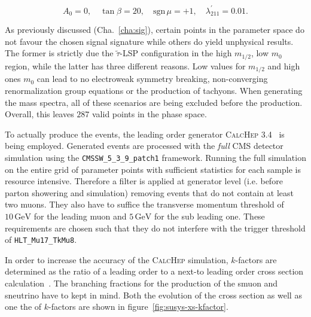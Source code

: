 \begin{equation}
  \label{eq:gen-mssm-parameters}
  A_0 = 0, \quad \tan{\beta} = 20, \quad \text{sgn}\,\mu = +1, \quad \lambda^\prime_{211} = 0.01.
\end{equation}

As previously discussed (Cha.~\ref{cha:sig}), certain points in the parameter space do not favour the chosen signal signature while others do yield unphysical results. The former is strictly due the $\tilde{\tau}$-LSP configuration in the high $m_{1/2}$, low $m_0$ region, while the latter has three different reasons. Low values for $m_{1/2}$ and high ones $m_0$ can lead to no electroweak symmetry breaking, non-converging renormalization group equations or the production of tachyons. When generating the mass spectra, all of these scenarios are being excluded before the production. Overall, this leaves $287$ valid points in the phase space.

To actually produce the events, the leading order generator \textsc{CalcHep 3.4}~\cite{calchep} is being employed. Generated events are processed with the \textit{full} CMS detector simulation using the \verb+CMSSW_5_3_9_patch1+ framework. Running the full simulation on the entire grid of parameter points with sufficient statistics for each sample is resource intensive. Therefore a filter is applied at generator level (i.e. before parton showering and simulation) removing events that do not contain at least two muons. They also have to suffice the transverse momentum threshold of $10\,\text{GeV}$ for the leading muon and $5\,\text{GeV}$ for the sub leading one. These requirements are chosen such that they do not interfere with the trigger threshold of \verb+HLT_Mu17_TkMu8+.

In order to increase the accuracy of the \textsc{CalcHep} simulation, $k$-factors are determined as the ratio of a leading order to a next-to leading order cross section calculation~\cite{susyxstool}. The branching fractions for the production of the smuon and sneutrino have to kept in mind. Both the evolution of the cross section as well as one the of $k$-factors are shown in figure~\ref{fig:susys-xs-kfactor}.

